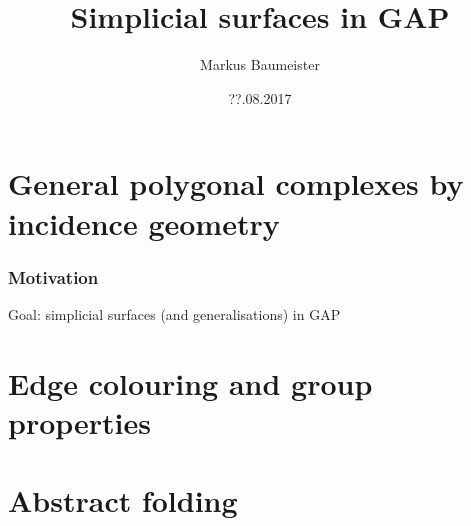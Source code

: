 \documentclass[11pt]{beamer}
\author{Markus Baumeister}
\title{Simplicial surfaces in GAP}
\date{??.08.2017}
\theoremstyle{remark}
\begin{document}
\begin{frame}
\titlepage
\end{frame}


\begin{frame}
    \tableofcontents
\end{frame}


\section{General polygonal complexes by incidence geometry}
\frame{\tableofcontents[currentsection]}

\begin{frame}
    \frametitle{Motivation}
    \pause
    Goal: simplicial surfaces (and generalisations) in GAP
    \pause
    \begin{center}
        
    \end{center}
\end{frame}



\section{Edge colouring and group properties}
\frame{\tableofcontents[currentsection]}


\section{Abstract folding}
\frame{\tableofcontents[currentsection]}
\end{document}

